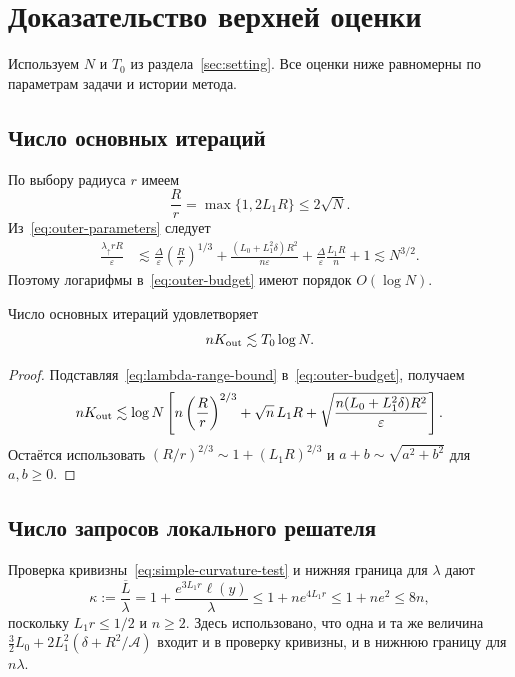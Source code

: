 \section{Доказательство верхней оценки}\label{app:upper-constants}
Используем $N$ и $T_0$ из раздела~\ref{sec:setting}.
Все оценки ниже равномерны по параметрам задачи и истории метода.

\subsection{Число основных итераций}
По выбору радиуса $r$ имеем
\[
 \frac Rr=\max\{1,2L_1R\}\le2\sqrt N.
\]
Из~\eqref{eq:outer-parameters} следует
\begin{equation}\label{eq:lambda-range-bound}
 \begin{aligned}
 \frac{\lambda_{\uparrow}rR}{\varepsilon}
 &\lesssim
 \frac\Delta\varepsilon\left(\frac Rr\right)^{1/3}
 +\frac{(L_0+L_1^2\delta)R^2}{n\varepsilon}
 +\frac\Delta\varepsilon\frac{L_1R}{n}+1
 \lesssim N^{3/2}.
 \end{aligned}
\end{equation}
Поэтому логарифмы в~\eqref{eq:outer-budget} имеют порядок $O(\log N)$.

\begin{lemma}\label{lem:outer-numerical}
Число основных итераций удовлетворяет
\begin{equation}\label{eq:outer-13}
 nK_{\rm out}\lesssim T_0\log N.
\end{equation}
\end{lemma}
\begin{proof}
Подставляя~\eqref{eq:lambda-range-bound} в~\eqref{eq:outer-budget}, получаем
\[
 nK_{\rm out}\lesssim\log N\left[
 n\left(\frac Rr\right)^{2/3}
 +\sqrt n\,L_1R
 +\sqrt{\frac{n(L_0+L_1^2\delta)R^2}{\varepsilon}}\right].
\]
Остаётся использовать $(R/r)^{2/3}\sim1+(L_1R)^{2/3}$
и $a+b\sim\sqrt{a^2+b^2}$ для $a,b\ge0$.
\end{proof}

\subsection{Число запросов локального решателя}
Проверка кривизны~\eqref{eq:simple-curvature-test} и нижняя граница
для $\lambda$ дают
\begin{equation}\label{eq:condition-number-simple}
 \kappa:=\frac{\overline L}{\lambda}
 =1+\frac{e^{3L_1r}\ell(y)}\lambda
 \le1+ne^{4L_1r}\le1+ne^2\le8n,
\end{equation}
поскольку $L_1r\le1/2$ и $n\ge2$. Здесь использовано, что одна и та же величина
$\frac32L_0+2L_1^2(\delta+R^2/\mathcal A)$ входит и в проверку кривизны,
и в нижнюю границу для $n\lambda$.

